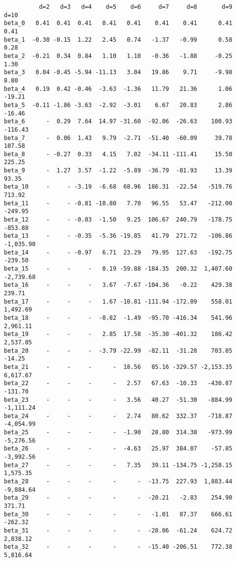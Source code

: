 \documentclass[11pt]{article}
\begin{document}
    
    \begin{verbatim}
          d=2   d=3   d=4    d=5    d=6     d=7     d=8       d=9      d=10
beta_0   0.41  0.41  0.41   0.41   0.41    0.41    0.41      0.41      0.41
beta_1  -0.30 -0.15  1.22   2.45   0.74   -1.37   -0.99      0.58      0.28
beta_2  -0.21  0.34  0.84   1.10   1.10   -0.36   -1.88     -0.25      1.30
beta_3   0.04 -0.45 -5.94 -11.13   3.04   19.86    9.71     -9.98      8.80
beta_4   0.19  0.42 -0.46  -3.63  -1.36   11.79   21.36      1.06    -19.21
beta_5  -0.11 -1.86 -3.63  -2.92  -3.01    6.67   20.83      2.86    -16.46
beta_6      -  0.29  7.64  14.97 -31.60  -92.06  -26.63    100.93   -116.43
beta_7      -  0.06  1.43   9.79  -2.71  -51.40  -60.09     39.78    107.58
beta_8      - -0.27  0.33   4.15   7.02  -34.11 -111.41     15.50    225.25
beta_9      -  1.27  3.57  -1.22  -5.89  -36.79  -81.93     13.39     93.35
beta_10     -     - -3.19  -6.68  68.96  186.31  -22.54   -519.76    713.92
beta_11     -     - -0.81 -10.80   7.70   96.55   53.47   -212.00   -249.95
beta_12     -     - -0.03  -1.50   9.25  106.67  240.79   -178.75   -853.88
beta_13     -     - -0.35  -5.36 -19.85   41.79  271.72   -106.86 -1,035.90
beta_14     -     - -0.97   6.71  23.29   79.95  127.63   -192.75   -239.50
beta_15     -     -     -   0.19 -59.88 -184.35  200.32  1,407.60 -2,739.68
beta_16     -     -     -   3.67  -7.67 -104.36   -0.22    429.38    239.71
beta_17     -     -     -   1.67 -10.81 -111.94 -172.09    558.01  1,492.69
beta_18     -     -     -  -0.82  -1.49  -95.70 -416.34    541.96  2,961.11
beta_19     -     -     -   2.85  17.58  -35.30 -401.32    186.42  2,537.05
beta_20     -     -     -  -3.79 -22.99  -82.11  -31.28    703.05    -14.25
beta_21     -     -     -      -  18.56   85.16 -329.57 -2,153.35  6,617.67
beta_22     -     -     -      -   2.57   67.63  -10.33   -430.87   -131.70
beta_23     -     -     -      -   3.56   40.27  -51.30   -884.99 -1,111.24
beta_24     -     -     -      -   2.74   80.62  332.37   -718.87 -4,054.99
beta_25     -     -     -      -  -1.90   28.80  314.38   -973.99 -5,276.56
beta_26     -     -     -      -  -4.63   25.97  384.07    -57.85 -3,992.56
beta_27     -     -     -      -   7.35   39.11 -134.75 -1,258.15  1,575.35
beta_28     -     -     -      -      -  -13.75  227.93  1,883.44 -9,884.64
beta_29     -     -     -      -      -  -20.21   -2.83    254.90    371.71
beta_30     -     -     -      -      -   -1.01   87.37    666.61   -262.32
beta_31     -     -     -      -      -  -20.06  -61.24    624.72  2,838.12
beta_32     -     -     -      -      -  -15.40 -206.51    772.38  5,816.64

\end{verbatim}
\end{document}
